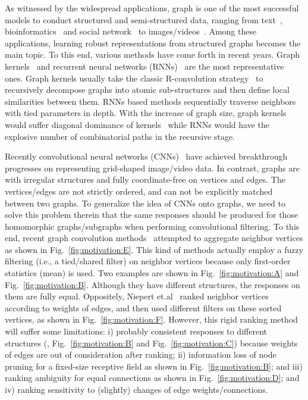 \documentclass[letterpaper]{article} \usepackage{aaai19}  \usepackage{times}  \usepackage{helvet}  \usepackage{courier}  \usepackage{url}  \usepackage{graphicx}  \frenchspacing  \setlength{\pdfpagewidth}{8.5in}  \setlength{\pdfpageheight}{11in}
\def\ie{{i.e.}} \def\etal{{et.al}}
\begin{document}
\begin{figure*}[t]
{	}
	\label{fig:motivation}
\end{figure*}

As witnessed by the widespread applications, graph is one of the most successful models to conduct structured and semi-structured data, ranging from text~\cite{defferrard2016convolutional}, bioinformatics~\cite{yanardag2015deep,niepert2016learning,song2018eeg} and social network~\cite{gomez2017dynamics,orsini2017shift} to images/videos~\cite{marino2016more,cui2018context,cui2017spectral}. Among these applications, learning robust representations from structured graphs becomes the main topic. To this end, various methods have come forth in recent years. Graph kernels~\cite{yanardag2015deep} and recurrent neural networks (RNNs)~\cite{scarselli2009graph} are the most representative ones. Graph kernels usually take the classic R-convolution strategy~\cite{haussler1999convolution} to recursively decompose graphs into atomic sub-structures and then define local similarities between them. RNNs based methods sequentially traverse neighbors with tied parameters in depth. With the increase of graph size, graph kernels would suffer diagonal dominance of kernels~\cite{scholkopf2002kernel} while RNNs would have the explosive number of combinatorial paths in the recursive stage.

Recently convolutional neural networks (CNNs)~\cite{lecun2015deep} have achieved breakthrough progresses on representing grid-shaped image/video data. In contrast, graphs are with irregular structures and fully coordinate-free on vertices and edges. The vertices/edges are not strictly ordered, and can not be explicitly matched between two graphs. To generalize the idea of CNNs onto graphs, we need to solve this problem therein that the same responses should be produced for those homomorphic graphs/subgraphs when performing convolutional filtering. To this end, recent graph convolution methods~\cite{defferrard2016convolutional,atwood2016diffusion,hamilton2017inductive} attempted to aggregate neighbor vertices as shown in Fig.~\ref{fig:motivation:E}. This kind of methods actually employ a fuzzy filtering (\ie, a tied/shared filter) on neighbor vertices because only first-order statistics (mean) is used. Two examples are shown in Fig.~\ref{fig:motivation:A} and Fig.~\ref{fig:motivation:B}. Although they have different structures, the responses on them are fully equal. Oppositely, Niepert \etal~\cite{niepert2016learning} ranked neighbor vertices according to weights of edges, and then used different filters on these sorted vertices, as shown in Fig.~\ref{fig:motivation:F}. However, this rigid ranking method will suffer some limitations: i) probably consistent responses to different structures (\eg, Fig.~\ref{fig:motivation:B} and Fig.~\ref{fig:motivation:C}) because weights of edges are out of consideration after ranking; ii) information loss of node pruning for a fixed-size receptive field as shown in Fig.~\ref{fig:motivation:B}; and iii) ranking ambiguity for equal connections as shown in Fig.~\ref{fig:motivation:D}; and iv) ranking sensitivity to (slightly) changes of edge weights/connections.
\end{document}
